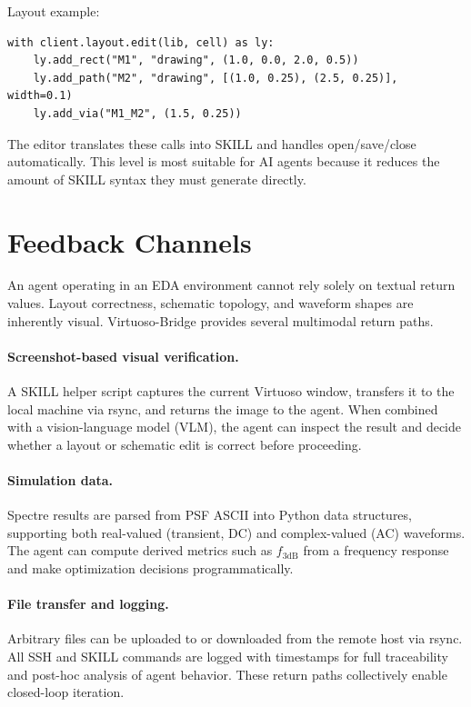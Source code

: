 \documentclass[lettersize,journal]{ieee_template/IEEEtran}
\begin{document}
Layout example:

\begin{lstlisting}
with client.layout.edit(lib, cell) as ly:
    ly.add_rect("M1", "drawing", (1.0, 0.0, 2.0, 0.5))
    ly.add_path("M2", "drawing", [(1.0, 0.25), (2.5, 0.25)], width=0.1)
    ly.add_via("M1_M2", (1.5, 0.25))
\end{lstlisting}

The editor translates these calls into SKILL and handles open/save/close automatically. This level is most suitable for AI agents because it reduces the amount of SKILL syntax they must generate directly.



\section{Feedback Channels}

An agent operating in an EDA environment cannot rely solely on textual return values. Layout correctness, schematic topology, and waveform shapes are inherently visual. Virtuoso-Bridge provides several multimodal return paths.

\paragraph{Screenshot-based visual verification.} A SKILL helper script captures the current Virtuoso window, transfers it to the local machine via rsync, and returns the image to the agent. When combined with a vision-language model (VLM), the agent can inspect the result and decide whether a layout or schematic edit is correct before proceeding.

\paragraph{Simulation data.} Spectre results are parsed from PSF ASCII into Python data structures, supporting both real-valued (transient, DC) and complex-valued (AC) waveforms. The agent can compute derived metrics such as $f_\mathrm{3dB}$ from a frequency response and make optimization decisions programmatically.

\paragraph{File transfer and logging.} Arbitrary files can be uploaded to or downloaded from the remote host via rsync. All SSH and SKILL commands are logged with timestamps for full traceability and post-hoc analysis of agent behavior. These return paths collectively enable closed-loop iteration.
\end{document}
